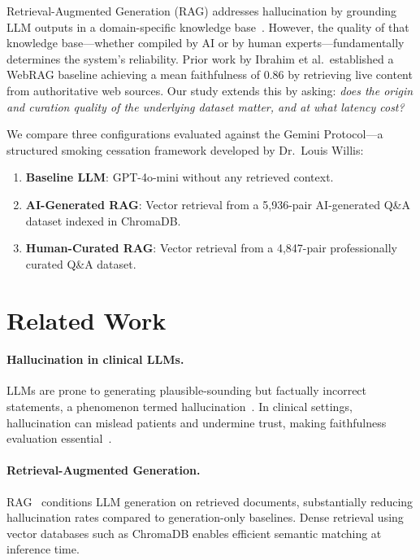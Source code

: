 \documentclass[11pt,a4paper]{article}
\begin{document}
Retrieval-Augmented Generation (RAG) addresses hallucination by grounding
LLM outputs in a domain-specific knowledge base~\citep{lewis2020rag}.
However, the quality of that knowledge base—whether compiled by AI or by
human experts—fundamentally determines the system's reliability.
Prior work by Ibrahim et al.\ established a WebRAG baseline achieving a mean
faithfulness of $0.86$ by retrieving live content from authoritative web sources.
Our study extends this by asking: \emph{does the origin and curation quality of
the underlying dataset matter, and at what latency cost?}

We compare three configurations evaluated against the Gemini Protocol—a
structured smoking cessation framework developed by Dr.\ Louis Willis:
\begin{enumerate}
  \item \textbf{Baseline LLM}: GPT-4o-mini without any retrieved context.
  \item \textbf{AI-Generated RAG}: Vector retrieval from a 5,936-pair
        AI-generated Q\&A dataset indexed in ChromaDB.
  \item \textbf{Human-Curated RAG}: Vector retrieval from a 4,847-pair
        professionally curated Q\&A dataset.
\end{enumerate}

\section{Related Work}

\paragraph{Hallucination in clinical LLMs.}
LLMs are prone to generating plausible-sounding but factually incorrect
statements, a phenomenon termed hallucination~\citep{ji2023survey}.
In clinical settings, hallucination can mislead patients and undermine trust,
making faithfulness evaluation essential~\citep{singhal2023}.

\paragraph{Retrieval-Augmented Generation.}
RAG~\citep{lewis2020rag} conditions LLM generation on retrieved documents,
substantially reducing hallucination rates compared to generation-only baselines.
Dense retrieval using vector databases such as ChromaDB enables efficient
semantic matching at inference time.
\end{document}
